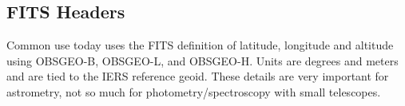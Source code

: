 \subsection{FITS Headers}

Common use today uses the FITS definition of latitude, longitude and 
altitude using OBSGEO-B, OBSGEO-L, and OBSGEO-H. Units are degrees
and meters and are tied to the IERS reference geoid. These details
are very important for astrometry, not so much for photometry/spectroscopy
with small telescopes.
